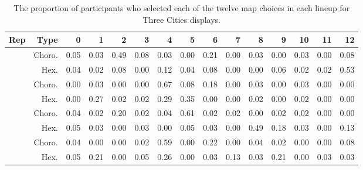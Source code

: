 \documentclass{monashthesis}
\begin{document}
\begin{table}

\caption{\label{tab:choice-three}The proportion of participants who selected each of the twelve map choices in each lineup for Three Cities displays.}
\centering
\begin{tabular}[t]{rrrrrrrrrrrrrrr}
\toprule
Rep & Type & 0 & 1 & 2 & 3 & 4 & 5 & 6 & 7 & 8 & 9 & 10 & 11 & 12\\
\midrule
 & Choro. & 0.05 & 0.03 & 0.49 & 0.08 & 0.03 & 0.00 & 0.21 & 0.00 & 0.03 & 0.00 & 0.03 & 0.00 & 0.08\\
\cmidrule{2-15}
\multirow{-2}{*}{\raggedleft\arraybackslash 1} & Hex. & 0.04 & 0.02 & 0.08 & 0.00 & 0.12 & 0.04 & 0.08 & 0.00 & 0.00 & 0.06 & 0.02 & 0.02 & 0.53\\
\cmidrule{1-15}
 & Choro. & 0.00 & 0.03 & 0.00 & 0.00 & 0.67 & 0.08 & 0.18 & 0.00 & 0.03 & 0.00 & 0.03 & 0.00 & 0.00\\
\cmidrule{2-15}
\multirow{-2}{*}{\raggedleft\arraybackslash 2} & Hex. & 0.00 & 0.27 & 0.02 & 0.02 & 0.29 & 0.35 & 0.00 & 0.00 & 0.02 & 0.00 & 0.02 & 0.00 & 0.00\\
\cmidrule{1-15}
 & Choro. & 0.04 & 0.02 & 0.20 & 0.02 & 0.04 & 0.61 & 0.02 & 0.02 & 0.00 & 0.02 & 0.02 & 0.00 & 0.00\\
\cmidrule{2-15}
\multirow{-2}{*}{\raggedleft\arraybackslash 3} & Hex. & 0.05 & 0.03 & 0.00 & 0.03 & 0.00 & 0.05 & 0.03 & 0.00 & 0.49 & 0.18 & 0.03 & 0.00 & 0.13\\
\cmidrule{1-15}
 & Choro. & 0.04 & 0.00 & 0.00 & 0.02 & 0.59 & 0.00 & 0.22 & 0.00 & 0.04 & 0.02 & 0.00 & 0.00 & 0.08\\
\cmidrule{2-15}
\multirow{-2}{*}{\raggedleft\arraybackslash 4} & Hex. & 0.05 & 0.21 & 0.00 & 0.05 & 0.26 & 0.00 & 0.03 & 0.13 & 0.03 & 0.21 & 0.00 & 0.03 & 0.03\\
\bottomrule
\end{tabular}
\end{table}
\end{document}
